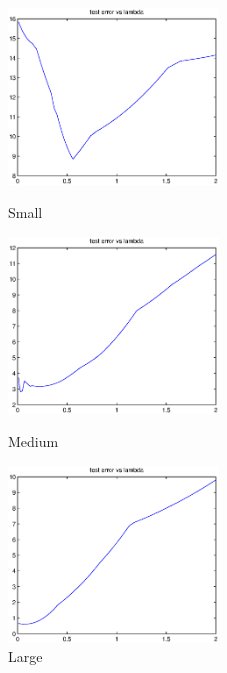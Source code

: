 \documentclass{article}
\theoremstyle{definition}
\theoremstyle{definition}
\theoremstyle{remark}
\begin{document}
\begin{figure}[!htbp]
\begin{minipage}[t]{0.3\linewidth}
\centering
\includegraphics[width=2.2in]{s5.eps}
\caption{Small}
\end{minipage}%
\begin{minipage}[t]{0.3\linewidth}
\centering
\includegraphics[width=2.2in]{m5.eps}
\caption{Medium}
\end{minipage}
\begin{minipage}[t]{0.3\linewidth}
\centering
\includegraphics[width=2.2in]{l5.eps}
\caption{Large}
\end{minipage}
\end{figure}

\end{document}

